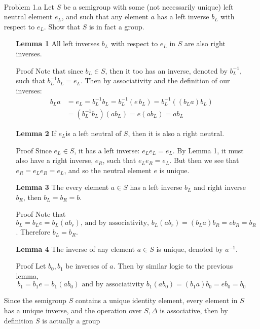 \documentclass[letterpaper]{article}
\begin{document}
 \\
\begin{itemize}
      \item[Problem 1.a] Let \(S\) be a semigroup with some (not necessarily unique) left neutral element \(e_L\), and such that any element \(a\) has a left inverse \(b_L\) with respect to \(e_L\). Show that \(S\) is in fact a group.
            \begin{itemize}
                  \item[\textbf{Lemma 1}] All left inverses \(b_L\) with respect to \(e_L\) in \(S\) are also right inverses.

                  \item[Proof] Note that since \(b_L \in S\), then it too has an inverse, denoted by \(b_{L}^{-1}\), such that \(b_{L}^{-1}b_{L} = e_{L}\). Then by associativity and the definition of our inverses:
                        \begin{align*}
                              b_{L}a & = e_L = b_{L}^{-1}b_L = b_{L}^{-1}(e\,b_L) = b_{L}^{-1}((b_{L}a)b_L) \\ & = (b_{L}^{-1}b_L)(ab_L) = e(ab_L) = ab_L
                        \end{align*}
                  \item[\textbf{Lemma 2}] If \(e_{L}\)is a left neutral of \(S\), then it is also a right neutral.

                  \item[Proof] Since \(e_L \in S\), it has a left inverse: \(e_{L}e_{L} = e_{L}\).
                        By Lemma 1, it must also have a right inverse, \(e_R\), such that \(e_{L}e_{R} = e_{L}\).
                        But then we see that \(e_R = e_{L}e_{R} = e_L\), and so the neutral element \(e\) is unique.
                  \item[\textbf{Lemma 3}] The every element \(a \in S\) has a left inverse \(b_L\) and right inverse \(b_R\), then \(b_L = b_R = b\).

                  \item[Proof] Note that \(b_L = b_Le = b_L(ab_r) \text{, and by associativity, } b_L(ab_r) = (b_L{a})b_R = eb_R = b_R \). Therefore \(b_L = b_R\).
                  \item[\textbf{Lemma 4}] The inverse of any element \(a \in S\) is unique, denoted by \(a^{-1}\).

                  \item[Proof] Let \(b_0, b_1\) be inverses of \(a\). Then by similar logic to the previous lemma,
                        \[b_{1} = b_{1}e =  b_{1}(ab_0) \text{ and by associativity } b_{1}({a}{b_0}) = ({b_1}{a})b_0 = eb_0 = b_0\]
            \end{itemize}
            Since the semigroup \(S\) contains a unique identity element, every element in \(S\) has a unique inverse, and the operation over \(S, \Delta\) is associative, then by definition \(S\) is actually a group



\end{itemize}
\end{document}
